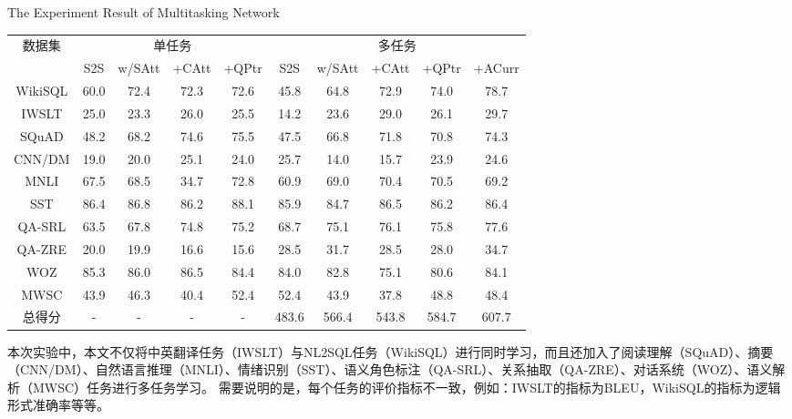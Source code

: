\begin{table}[!htpb]
    {The Experiment Result of Multitasking Network}
  \label{tab:drwwldsyjg}
  \centering
  \begin{threeparttable}[b]
     \begin{tabular}{cccccccccc}
      \toprule
      \multirow{2}{18mm}{数据集}&\multicolumn{4}{c}{单任务} & \multicolumn{5}{c}{多任务}\\
      \cmidrule(lr){2-5}\cmidrule(lr){6-10}
      & S2S & w/SAtt & +CAtt & +QPtr & S2S & w/SAtt & +CAtt & +QPtr & +ACurr\\
      \midrule
      WikiSQL & 60.0 & 72.4 & 72.3 & 72.6 & 45.8 & 64.8 & 72.9 & 74.0 & 78.7\\
      IWSLT & 25.0 & 23.3 & 26.0 & 25.5 & 14.2 & 23.6 & 29.0 & 26.1 & 29.7\\
      SQuAD & 48.2 & 68.2 & 74.6 & 75.5 & 47.5 & 66.8 & 71.8 & 70.8 & 74.3\\
      CNN/DM & 19.0 & 20.0 & 25.1 & 24.0 & 25.7 & 14.0 & 15.7 & 23.9 & 24.6\\
      MNLI & 67.5 & 68.5 & 34.7 & 72.8 & 60.9 & 69.0 & 70.4 & 70.5 & 69.2\\
      SST & 86.4 & 86.8 & 86.2 & 88.1 & 85.9 & 84.7 & 86.5 & 86.2 & 86.4\\
      QA-SRL & 63.5 & 67.8 & 74.8 & 75.2 & 68.7 & 75.1 & 76.1 & 75.8 & 77.6\\
      QA-ZRE & 20.0 & 19.9 & 16.6 & 15.6 & 28.5 & 31.7 & 28.5 & 28.0 & 34.7\\
      WOZ & 85.3 & 86.0 & 86.5 & 84.4 & 84.0 & 82.8 & 75.1 & 80.6 & 84.1\\
      MWSC & 43.9 & 46.3 & 40.4 & 52.4 & 52.4 & 43.9 & 37.8 & 48.8 & 48.4\\
      \midrule
      总得分 & - & - & - & - & 483.6 & 566.4 & 543.8 & 584.7 & 607.7\\
      \bottomrule
    \end{tabular}
  \end{threeparttable}
\end{table}

本次实验中，本文不仅将中英翻译任务（IWSLT）与NL2SQL任务（WikiSQL）进行同时学习，而且还加入了阅读理解（SQuAD）、摘要（CNN/DM）、自然语言推理（MNLI）、情绪识别（SST）、语义角色标注（QA-SRL）、关系抽取（QA-ZRE）、对话系统（WOZ）、语义解析（MWSC）任务进行多任务学习。
需要说明的是，每个任务的评价指标不一致，例如：IWSLT的指标为BLEU，WikiSQL的指标为逻辑形式准确率等等。

